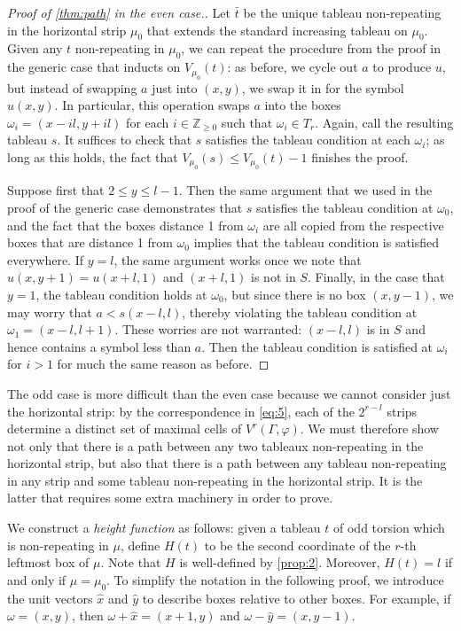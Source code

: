 \documentclass[11pt,reqno]{amsart}
\newcommand*{\Z}{\mathbb{Z}}
\theoremstyle{definition}
\theoremstyle{problem}
\theoremstyle{plain}
\theoremstyle{remark}
\theoremstyle{theorem}
\numberwithin{equation}{section}
\numberwithin{figure}{section}
\begin{document}
\begin{proof}[Proof of \cref{thm:path} in the even case.]
  Let $\bar{t}$ be the unique tableau non-repeating in the horizontal
  strip $\mu_0$ that extends the standard increasing tableau on
  $\mu_0$.  Given any $t$ non-repeating in $\mu_0$, we can repeat the
  procedure from the proof in the generic case that inducts on
  $V_{\mu_0}(t)$: as before, we cycle out $a$ to produce $u$, but
  instead of swapping $a$ just into $(x,y)$, we swap it in for the
  symbol $u(x,y)$.  In particular, this operation swaps $a$ into the
  boxes $\omega_i = (x-il,y+il)$ for each $i \in \Z_{\geq 0}$ such
  that $\omega_i \in T_r$.  Again, call the resulting tableau $s$.  It
  suffices to check that $s$ satisfies the tableau condition at each
  $\omega_i$; as long as this holds, the fact that
  $V_{\mu_0}(s) \leq V_{\mu_0}(t) - 1$ finishes the proof.

  Suppose first that $2 \leq y \leq l-1$.  Then the same argument that
  we used in the proof of the generic case demonstrates that $s$
  satisfies the tableau condition at $\omega_0$, and the fact that the
  boxes distance 1 from $\omega_i$ are all copied from the respective
  boxes that are distance 1 from $\omega_0$ implies that the tableau
  condition is satisfied everywhere.  If $y = l$, the same argument
  works once we note that $u(x,y+1) = u(x+l,1)$ and $(x+l,1)$ is not
  in $S$.  Finally, in the case that $y = 1$, the tableau condition
  holds at $\omega_0$, but since there is no box $(x,y-1)$, we may
  worry that $a < s(x-l,l)$, thereby violating the tableau condition
  at $\omega_1 = (x-l,l+1)$.  These worries are not warranted:
  $(x-l,l)$ is in $S$ and hence contains a symbol less than $a$.  Then
  the tableau condition is satisfied at $\omega_i$ for $i > 1$ for
  much the same reason as before.
\end{proof}

The odd case is more difficult than the even case because we cannot
consider just the horizontal strip: by the correspondence in
\cref{eq:5}, each of the $2^{r-l}$ strips determine a distinct set of
maximal cells of $V^r(\Gamma,\varphi)$.  We must therefore show not
only that there is a path between any two tableaux non-repeating in
the horizontal strip, but also that there is a path between any
tableau non-repeating in any strip and some tableau non-repeating in
the horizontal strip.  It is the latter that requires some extra
machinery in order to prove.

We construct a \textit{height function} as follows: given a tableau
$t$ of odd torsion which is non-repeating in $\mu$, define $H(t)$ to
be the second coordinate of the $r$-th leftmost box of $\mu$.  Note
that $H$ is well-defined by \cref{prop:2}.  Moreover, $H(t) = l$ if
and only if $\mu = \mu_0$.  To simplify the notation in the following
proof, we introduce the unit vectors $\hat x$ and $\hat y$ to describe
boxes relative to other boxes.  For example, if $\omega = (x,y)$, then
$\omega + \hat x = (x+1,y)$ and $\omega - \hat y = (x,y-1)$.
\end{document}
